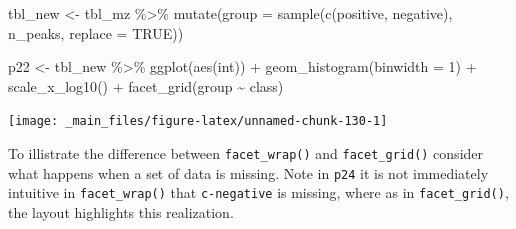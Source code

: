 \documentclass[
]{book}
\newenvironment{Shaded}{\begin{snugshade}}{\end{snugshade}}
\newcommand{\AttributeTok}[1]{\textcolor[rgb]{0.77,0.63,0.00}{#1}}
\newcommand{\ConstantTok}[1]{\textcolor[rgb]{0.00,0.00,0.00}{#1}}
\newcommand{\DecValTok}[1]{\textcolor[rgb]{0.00,0.00,0.81}{#1}}
\newcommand{\FunctionTok}[1]{\textcolor[rgb]{0.00,0.00,0.00}{#1}}
\newcommand{\NormalTok}[1]{#1}
\newcommand{\OtherTok}[1]{\textcolor[rgb]{0.56,0.35,0.01}{#1}}
\newcommand{\SpecialCharTok}[1]{\textcolor[rgb]{0.00,0.00,0.00}{#1}}
\newcommand{\StringTok}[1]{\textcolor[rgb]{0.31,0.60,0.02}{#1}}
\begin{document}
\begin{Shaded}
\begin{Highlighting}[]
\NormalTok{tbl\_new }\OtherTok{\textless{}{-}}\NormalTok{ tbl\_mz }\SpecialCharTok{\%\textgreater{}\%}
  \FunctionTok{mutate}\NormalTok{(}\AttributeTok{group =} \FunctionTok{sample}\NormalTok{(}\FunctionTok{c}\NormalTok{(}\StringTok{\textquotesingle{}positive\textquotesingle{}}\NormalTok{, }\StringTok{\textquotesingle{}negative\textquotesingle{}}\NormalTok{), n\_peaks, }\AttributeTok{replace =} \ConstantTok{TRUE}\NormalTok{))}

\NormalTok{p22 }\OtherTok{\textless{}{-}}\NormalTok{ tbl\_new }\SpecialCharTok{\%\textgreater{}\%} 
  \FunctionTok{ggplot}\NormalTok{(}\FunctionTok{aes}\NormalTok{(int)) }\SpecialCharTok{+} 
  \FunctionTok{geom\_histogram}\NormalTok{(}\AttributeTok{binwidth =} \DecValTok{1}\NormalTok{) }\SpecialCharTok{+}
  \FunctionTok{scale\_x\_log10}\NormalTok{() }\SpecialCharTok{+}
  \FunctionTok{facet\_grid}\NormalTok{(group }\SpecialCharTok{\textasciitilde{}}\NormalTok{ class)}
\end{Highlighting}
\end{Shaded}

\begin{center}\texttt{[image: \_main\_files/figure-latex/unnamed-chunk-130-1]} \end{center}

To illistrate the difference between \texttt{facet\_wrap()} and \texttt{facet\_grid()} consider what happens when a set of data is missing. Note in \texttt{p24} it is not immediately intuitive in \texttt{facet\_wrap()} that \texttt{c-negative} is missing, where as in \texttt{facet\_grid()}, the layout highlights this realization.
\end{document}
